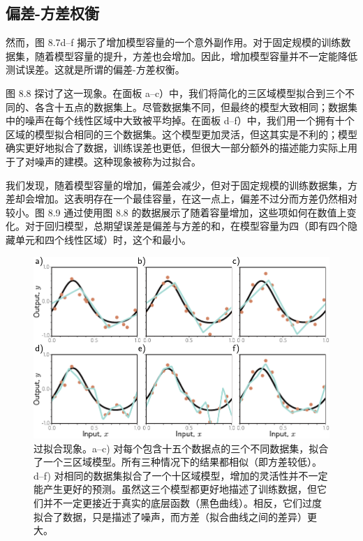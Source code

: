 \documentclass[lang=cn,newtx,10pt,scheme=chinese]{elegantbook}
\begin{document}
\subsection{偏差-方差权衡}
然而，图 8.7d–f 揭示了增加模型容量的一个意外副作用。对于固定规模的训练数据集，随着模型容量的提升，方差也会增加。因此，增加模型容量并不一定能降低测试误差。这就是所谓的偏差-方差权衡。

图 8.8 探讨了这一现象。在面板 a–c）中，我们将简化的三区域模型拟合到三个不同的、各含十五点的数据集上。尽管数据集不同，但最终的模型大致相同；数据集中的噪声在每个线性区域中大致被平均掉。在面板 d–f）中，我们用一个拥有十个区域的模型拟合相同的三个数据集。这个模型更加灵活，但这其实是不利的；模型确实更好地拟合了数据，训练误差也更低，但很大一部分额外的描述能力实际上用于了对噪声的建模。这种现象被称为过拟合。

我们发现，随着模型容量的增加，偏差会减少，但对于固定规模的训练数据集，方差却会增加。这表明存在一个最佳容量，在这一点上，偏差不过分而方差仍然相对较小。图 8.9 通过使用图 8.8 的数据展示了随着容量增加，这些项如何在数值上变化。对于回归模型，总期望误差是偏差与方差的和，在模型容量为四（即有四个隐藏单元和四个线性区域）时，这个和最小。

\begin{figure}[ht!]
\centering
\includegraphics[width=0.7\linewidth]{PDFFigures/UDLChap8PDF/PerfCapacityVariance.pdf}
\caption{过拟合现象。a–c) 对每个包含十五个数据点的三个不同数据集，拟合了一个三区域模型。所有三种情况下的结果都相似（即方差较低）。d–f) 对相同的数据集拟合了一个十区域模型，增加的灵活性并不一定能产生更好的预测。虽然这三个模型都更好地描述了训练数据，但它们并不一定更接近于真实的底层函数（黑色曲线）。相反，它们过度拟合了数据，只是描述了噪声，而方差（拟合曲线之间的差异）更大。}
\end{figure}
\end{document}
